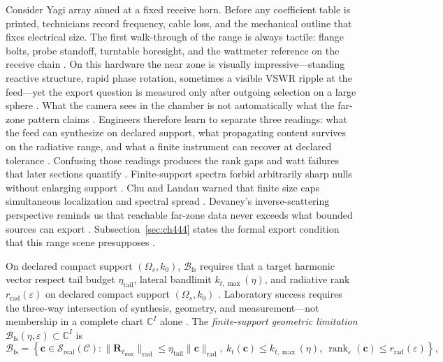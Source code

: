 \begin{physicalvignette}
Consider Yagi array aimed at a fixed receive horn. Before any coefficient table is printed, technicians record frequency, cable loss, and the mechanical outline that fixes electrical size. The first walk-through of the range is always tactile: flange bolts, probe standoff, turntable boresight, and the wattmeter reference on the receive chain \cite{hansen1988}.
On this hardware the near zone is visually impressive---standing reactive structure, rapid phase rotation, sometimes a visible VSWR ripple at the feed---yet the export question is measured only after outgoing selection on a large sphere \cite{harrington2001}. What the camera sees in the chamber is not automatically what the far-zone pattern claims \cite{stratton1941}.
Engineers therefore learn to separate three readings: what the feed can synthesize on declared support, what propagating content survives on the radiative range, and what a finite instrument can recover at declared tolerance \cite{devaney2004}. Confusing those readings produces the rank gaps and watt failures that later sections quantify \cite{pal2026}.
Finite-support spectra forbid arbitrarily sharp nulls without enlarging support . 
Chu and Landau warned that finite size caps simultaneous localization and spectral spread \cite{chu1948}. Devaney's inverse-scattering perspective reminds us that reachable far-zone data never exceeds what bounded sources can export \cite{devaney2004}.
Subsection~\ref{sec:ch444} states the formal export condition that this range scene presupposes \cite{stratton1941}.
\end{physicalvignette}
On declared compact support $(\Omega_s,k_0)$, $\mathcal{B}_{\mathrm{fs}}$ requires that a target harmonic vector respect tail budget $\eta_{\mathrm{tail}}$, lateral bandlimit $k_{t,\max}(\eta)$, and radiative rank $r_{\mathrm{rad}}(\varepsilon)$ on declared compact support $(\Omega_s,k_0)$ \cite{stratton1941}. Laboratory success requires the three-way intersection of synthesis, geometry, and measurement---not membership in a complete chart $\mathbb{C}^{I}$ alone \cite{hansen1988}.
\label{def:ch4.finite-support-restriction}
The \emph{finite-support geometric limitation} \(\mathcal{B}_{\mathrm{fs}}(\eta,\varepsilon)\subset\mathbb{C}^{I}\) is
\begin{equation}
\label{eq:ch4.finite-support-restriction}
\mathcal{B}_{\mathrm{fs}}
=
\left\{
\mathbf{c}\in\mathcal{S}_{\mathrm{real}}(\mathcal{C}):
\|\mathbf{R}_{\ell_{\max}}\|_{\mathrm{rad}}\le\eta_{\mathrm{tail}}\|\mathbf{c}\|_{\mathrm{rad}},\
k_{t}(\mathbf{c})\le k_{t,\max}(\eta),\
\operatorname{rank}_{\varepsilon}(\mathbf{c})\le r_{\mathrm{rad}}(\varepsilon)
\right\},
\end{equation}
